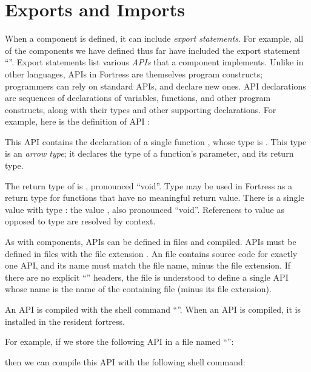\label{overviewComponent}
\section{Exports and Imports}

When a component is defined, it can include \emph{export statements}.
For example,
all of the components we have defined thus far
have included the export statement ``''.
Export statements list various \emph{APIs}
that a component implements.
Unlike in other languages, APIs in
Fortress are themselves program constructs; programmers can rely on
standard APIs, and declare new ones. API declarations are sequences of
declarations of
variables, functions, and other program constructs, along with their
types and other
supporting declarations. For example, here is the definition of API
:


This API contains the declaration of a single function ,
whose type is \EXP{() \rightarrow ()}. This type is an
\emph{arrow type}; it declares the type of a function's parameter,
and its return type.

The return type of  is \EXP{()}, pronounced ``void''.
Type \EXP{()} may be used in Fortress as a return type
for functions that have no meaningful return value.
There is a single value with type \EXP{()}:
the value \EXP{()}, also pronounced ``void''.
References to value \EXP{()} as opposed
to type \EXP{()} are resolved by context.

As with components, APIs can be defined in files and compiled. APIs
must be defined in files with the file extension .
An  file contains
source code for exactly one API, and its name must match the file name,
minus the file extension.
If there are  no explicit ``''
headers, the file is understood to define a single API whose name is
the name of the containing file (minus its file extension).

An API is compiled with the shell command ``''.
When an API is compiled,
it is installed in the resident fortress.


For example, if we store
the following API in a file named ``'':

then we can compile this API with the following shell command:



